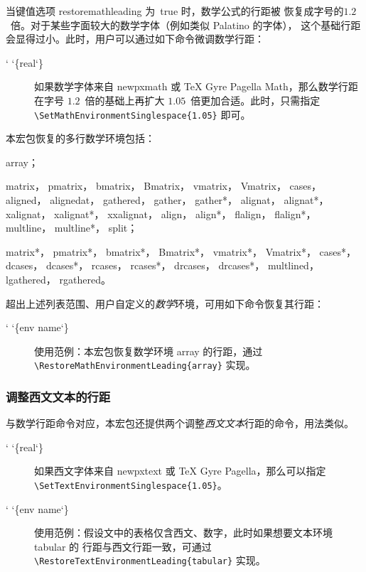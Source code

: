 \documentclass[zihao=5,no-math,a4paper]{ctexart}
\makeatletter
\newcommand*\meta{}
\DeclareRobustCommand\meta[1]{%
     \ensuremath\langle
     \ifmmode \expandafter \nfss@text \fi
     {%
      \meta@font@select
      \edef\meta@hyphen@restore
        {\hyphenchar\the\font\the\hyphenchar\font}%
      \hyphenchar\font\m@ne
      \language\l@nohyphenation
      #1\/%
      \meta@hyphen@restore
     }\ensuremath\rangle
}
\def\meta@font@select{\itshape}
\newcommand*\cmd[1]{\cs{\expandafter\cmd@to@cs\string#1}}
\def\cmd@to@cs#1#2{\char\number`#2\relax}
\newcommand*\cs{}
\DeclareRobustCommand\cs[1]{\texttt{\char`\\#1}}
\newcommand\marg[1]{%
  {\ttfamily\char`\{}\meta{#1}{\ttfamily\char`\}}}
\newcommand\pkg[1]{{\normalfont\ttfamily#1}}
\newcommand\opt[1]{{\normalfont\ttfamily#1}}
\newcommand\env[1]{{\normalfont\ttfamily#1}}
\makeatother
\begin{document}
当键值选项 \opt{restoremathleading} 为~\opt{true} 时，数学公式的行距被
恢复成字号的$1.2$~倍。对于某些字面较大的数学字体（例如类似 Palatino 的字体），
这个基础行距会显得过小。此时，用户可以通过如下命令微调数学行距：
\begin{description}
\item[\cmd{\SetMathEnvironmentSinglespace}\marg{real}]
如果数学字体来自 \pkg{newpxmath} 或 TeX Gyre Pagella Math，那么数学行距
在字号 $1.2$~倍的基础上再扩大 $1.05$~倍更加合适。此时，只需指定
\verb|\SetMathEnvironmentSinglespace{1.05}| 即可。
\end{description}
本宏包恢复的多行数学环境包括：
\begin{description}
\linespread{1.05}\selectfont
\raggedright
\item[\LaTeX 环境]
\env{array}；
\item[\pkg{\bfseries amsmath} 宏包各环境]
\env{matrix}，
\env{pmatrix}，
\env{bmatrix}，
\env{Bmatrix}，
\env{vmatrix}，
\env{Vmatrix}，
\env{cases}，
\env{aligned}，
\env{alignedat}，
\env{gathered}，
\env{gather}，
\env{gather*}，
\env{alignat}，
\env{alignat*}，
\env{xalignat}，
\env{xalignat*}，
\env{xxalignat}，
\env{align}，
\env{align*}，
\env{flalign}，
\env{flalign*}，
\env{multline}，
\env{multline*}，
\env{split}；
\item[\pkg{\bfseries mathtools} 宏包各环境]
\env{matrix*}，
\env{pmatrix*}，
\env{bmatrix*}，
\env{Bmatrix*}，
\env{vmatrix*}，
\env{Vmatrix*}，
\env{cases*}，
\env{dcases}，
\env{dcases*}，
\env{rcases}，
\env{rcases*}，
\env{drcases}，
\env{drcases*}，
\env{multlined}，
\env{lgathered}，
\env{rgathered}。
\end{description}
超出上述列表范围、用户自定义的\emph{数学}环境，可用如下命令恢复其行距：
\begin{description}
\item[\cmd{\RestoreMathEnvironmentLeading}\marg{env name}]
使用范例：本宏包恢复数学环境 \env{array} 的行距，通过
\verb|\RestoreMathEnvironmentLeading{array}| 实现。
\end{description}

\subsubsection{调整西文文本的行距}

与数学行距命令对应，本宏包还提供两个调整\emph{西文文本}行距的命令，用法类似。
\begin{description}
\item[\cmd{\SetTextEnvironmentSinglespace}\marg{real}]
如果西文字体来自 \pkg{newpxtext} 或 TeX Gyre Pagella，那么可以指定
\verb|\SetTextEnvironmentSinglespace{1.05}|。
\item[\cmd{\RestoreTextEnvironmentLeading}\marg{env name}]
使用范例：假设文中的表格仅含西文、数字，此时如果想要文本环境 \env{tabular} 的
行距与西文行距一致，可通过
\verb|\RestoreTextEnvironmentLeading{tabular}| 实现。
\end{description}
\end{document}
